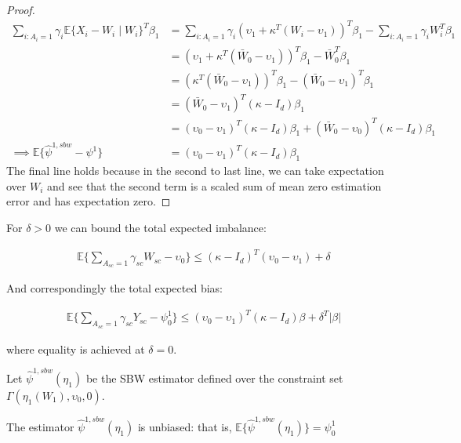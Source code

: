 \begin{proof}
\begin{align*}
    \sum_{i: A_i = 1} \gamma_i\mathbb{E}\{X_i - W_i \mid W_i\}^T\beta_1 &= \sum_{i: A_i = 1} \gamma_i (\upsilon_1 + \kappa^T(W_i - \upsilon_1))^T\beta_1 - \sum_{i: A_i = 1}\gamma_i W_i^T\beta_1 \\
    &= (\upsilon_1 + \kappa^T(\bar{W}_0 - \upsilon_1))^T\beta_1 - \bar{W}_0^T\beta_1 \\
    &= (\kappa^T(\bar{W}_0 - \upsilon_1))^T\beta_1 - (\bar{W}_0 - \upsilon_1)^T\beta_1  \\
    &= (\bar{W}_0 - \upsilon_1)^T(\kappa - I_d)\beta_1 \\
    &= (\upsilon_0 - \upsilon_1)^T(\kappa - I_d)\beta_1 + (\bar{W}_0 - \upsilon_0)^T(\kappa - I_d)\beta_1 \\
    \implies \mathbb{E}\{\hat{\psi}^{1, sbw} - \psi^1\} &= (\upsilon_0 - \upsilon_1)^T(\kappa - I_d)\beta_1
\end{align*}
%
The final line holds because in the second to last line, we can take expectation over $W_i$ and see that the second term is a scaled sum of mean zero estimation error and has expectation zero. 
\end{proof}

\begin{remark}
For $\delta > 0$ we can bound the total expected imbalance:

\begin{align*}
    \mathbb{E}\{\sum_{A_{sc} = 1}\gamma_{sc}W_{sc} - \upsilon_0\} \le (\kappa - I_d)^T(\upsilon_0 - \upsilon_1) + \delta
\end{align*}

And correspondingly the total expected bias:

\begin{align*}
    \mathbb{E}\{\sum_{A_{sc} = 1}\gamma_{sc}Y_{sc} - \psi_0^1\} \le (\upsilon_0 - \upsilon_1)^T(\kappa - I_d)\beta + \delta^T\lvert\beta\lvert
\end{align*}

where equality is achieved at $\delta = 0$.
\end{remark}

Let $\hat{\psi}^{1, sbw}(\eta_1)$ be the SBW estimator defined over the constraint set $\Gamma(\eta_1(W_1), \upsilon_0, 0)$.

\begin{proposition}
The estimator $\hat{\psi}^{1, sbw}(\eta_1)$ is unbiased: that is,
$\mathbb{E}\{\hat{\psi}^{1, sbw}(\eta_1)\} = \psi_0^1$
\end{proposition}

